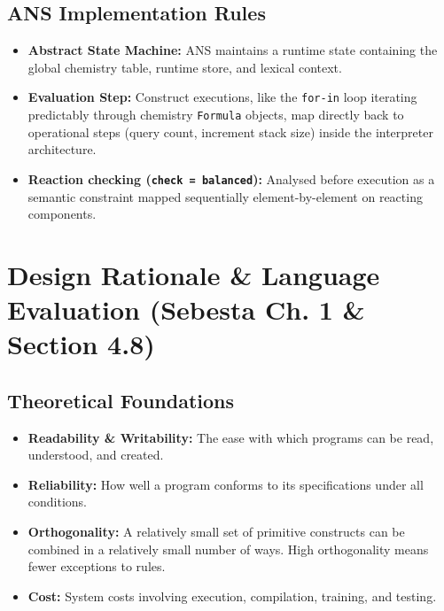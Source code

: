 \documentclass[11pt,a4paper]{article}
\newcommand{\code}[1]{\texttt{#1}}
\begin{document}
\subsection*{ANS Implementation Rules}
\begin{itemize}
    \item \textbf{Abstract State Machine:} ANS maintains a runtime state containing the global chemistry table, runtime store, and lexical context.
    \item \textbf{Evaluation Step:} Construct executions, like the \code{for-in} loop iterating predictably through chemistry \code{Formula} objects, map directly back to operational steps (query count, increment stack size) inside the interpreter architecture. 
    \item \textbf{Reaction checking (\code{check = balanced}):} Analysed before execution as a semantic constraint mapped sequentially element-by-element on reacting components.
\end{itemize}

\section{Design Rationale \& Language Evaluation (Sebesta Ch. 1 \& Section 4.8)}
\subsection*{Theoretical Foundations}
\begin{itemize}
    \item \textbf{Readability \& Writability:} The ease with which programs can be read, understood, and created.
    \item \textbf{Reliability:} How well a program conforms to its specifications under all conditions.
    \item \textbf{Orthogonality:} A relatively small set of primitive constructs can be combined in a relatively small number of ways. High orthogonality means fewer exceptions to rules.
    \item \textbf{Cost:} System costs involving execution, compilation, training, and testing.
\end{itemize}
\end{document}
